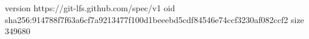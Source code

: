 version https://git-lfs.github.com/spec/v1
oid sha256:914788f7f63a6cf7a9213477f100d1beeebd5cdf84546e74ccf3230af082ccf2
size 349680
